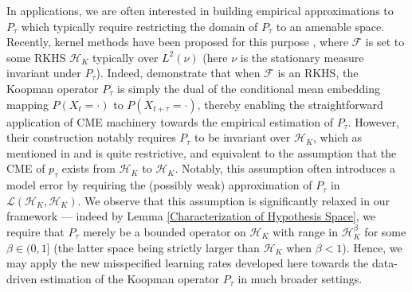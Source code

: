 \documentclass[accepted]{article}
\theoremstyle{definition}
\begin{document}
In applications, we are often interested in building empirical approximations to $P_{\tau}$ which typically require restricting the domain of $P_{\tau}$ to an amenable space. Recently, kernel methods have been proposed for this purpose \citep{klus2020eigendecompositions, mollenhauer2020kernel, klus2018data}, where $\mathcal{F}$ is set to some RKHS $\mathcal{H}_K$ typically over $L^2(\nu)$ (here $\nu$ is the stationary measure invariant under $P_{\tau}$). Indeed, \cite{klus2020eigendecompositions} demonstrate that when $\mathcal{F}$ is an RKHS, the Koopman operator $P_{\tau}$ is simply the dual of the conditional mean embedding mapping $P(X_t = \cdot)$ to $P(X_{t + \tau} = \cdot)$, thereby enabling the straightforward application of CME machinery towards the empirical estimation of $P_{\tau}$. However, their construction notably requires $P_{\tau}$ to be invariant over $\mathcal{H}_K$, which as mentioned in \cite{mollenhauer2020kernel} and \cite{das2020koopman} is quite restrictive, and equivalent to the assumption that the CME of $p_{\tau}$ exists from $\mathcal{H}_K$ to $\mathcal{H}_K$. Notably,  this assumption often introduces a model error by requiring the (possibly weak) approximation of $P_{\tau}$ in $\mathcal{L}(\mathcal{H}_K, \mathcal{H}_K)$. We observe that this assumption is significantly relaxed in our framework --- indeed by Lemma \ref{Characterization of Hypothesis Space}, we require that $P_{\tau}$ merely be a bounded operator on $\mathcal{H}_K$ with range in $\mathcal{H}^{\beta}_{K}$ for some $\beta \in (0, 1]$ (the latter space being strictly larger than $\mathcal{H}_K$ when $\beta < 1$). Hence, we may apply the new misspecified learning rates developed here towards the data-driven estimation of the Koopman operator $P_{\tau}$ in much broader settings. 

\end{document}

